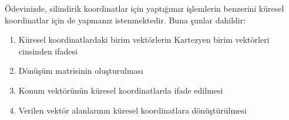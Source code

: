 \documentclass[11pt,letterpaper,twocolumn]{fenbil}
\begin{document}
Ödevinizde, silindirik koordinatlar için yaptığımız işlemlerin benzerini küresel koordinatlar için de yapmanız istenmektedir. Buna şunlar dahildir:
\begin{enumerate}
    \item Küresel koordinatlardaki birim vektörlerin Kartezyen birim vektörleri cinsinden ifadesi
    \item Dönüşüm matrisinin oluşturulması
    \item Konum vektörünün küresel koordinatlarda ifade edilmesi
    \item Verilen vektör alanlarının küresel koordinatlara dönüştürülmesi
\end{enumerate}
\end{document}
